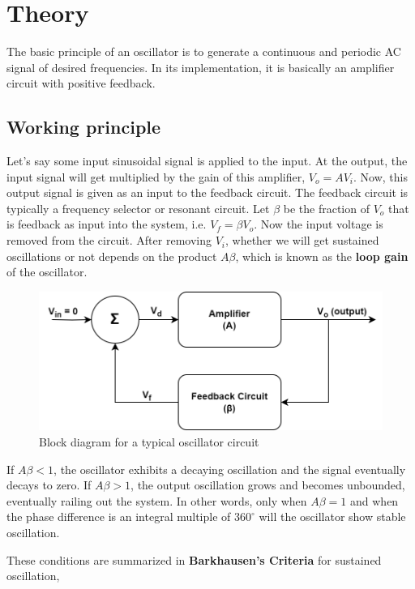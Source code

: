 \section{Theory}

The basic principle of an oscillator is to generate a continuous and periodic AC signal of desired frequencies. In its implementation, it is basically an amplifier circuit with positive feedback.

\subsection*{Working principle}

Let's say some input sinusoidal signal is applied to the input. At the output, the input signal will get multiplied by the gain of this amplifier, $V_o = AV_i$. Now, this output signal is given as an input to the feedback circuit. The feedback circuit is typically a frequency selector or resonant circuit. Let $\beta$ be the fraction of $V_o$ that is feedback as input into the system, i.e. $V_f = \beta V_o$. Now the input voltage is removed from the circuit. After removing $V_i$, whether we will get sustained oscillations or not depends on the product $A\beta$, which is known as the \textbf{loop gain} of the oscillator.

\begin{figure}[H]
    \centering
    \includegraphics[width=0.85\columnwidth]{images/block.png}
    \caption{Block diagram for a typical oscillator circuit}
    \label{block}
\end{figure}

If $A\beta<1$, the oscillator exhibits a decaying oscillation and the signal eventually decays to zero. If $A\beta>1$, the output oscillation grows and becomes unbounded, eventually railing out the system. In other words, only when $A\beta=1$ and when the phase difference is an integral multiple of $360^{\circ}$ will the oscillator show stable oscillation.

These conditions are summarized in \textbf{Barkhausen's Criteria} for sustained oscillation,


